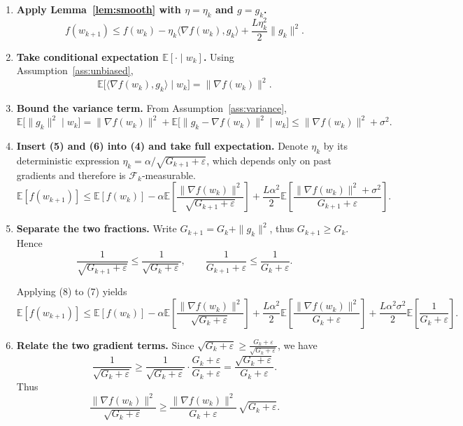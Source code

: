 \documentclass{article}
\newcommand{\E}{\mathbb{E}}
\begin{document}
\begin{enumerate}[label=[Step \arabic*],leftmargin=*]
\item \textbf{Apply Lemma~\ref{lem:smooth} with $\eta=\eta_k$ and $g=g_k$.}  
\[
f(w_{k+1})
\le f(w_k)-\eta_k\langle\nabla f(w_k),g_k\rangle
+\frac{L\eta_k^{2}}{2}\|g_k\|^{2}.
\tag{4}
\]

\item \textbf{Take conditional expectation $\E[\cdot\mid w_k]$.}  
Using Assumption~\ref{ass:unbiased},
\[
\E\bigl[\langle\nabla f(w_k),g_k\rangle\mid w_k\bigr]
= \|\nabla f(w_k)\|^{2}.
\tag{5}
\]

\item \textbf{Bound the variance term.}  
From Assumption~\ref{ass:variance},
\[
\E\bigl[\|g_k\|^{2}\mid w_k\bigr]
= \|\nabla f(w_k)\|^{2}+\E\bigl[\|g_k-\nabla f(w_k)\|^{2}\mid w_k\bigr]
\le \|\nabla f(w_k)\|^{2}+\sigma^{2}.
\tag{6}
\]

\item \textbf{Insert (5) and (6) into (4) and take full expectation.}  
Denote $\eta_k$ by its deterministic expression
$\eta_k=\alpha/\sqrt{G_{k+1}+\varepsilon}$, which depends only on past gradients and therefore is $\mathcal{F}_k$‑measurable.
\[
\E[f(w_{k+1})]
\le \E[f(w_k)]
-\alpha\E\!\left[\frac{\|\nabla f(w_k)\|^{2}}{\sqrt{G_{k+1}+\varepsilon}}\right]
+\frac{L\alpha^{2}}{2}\E\!\left[\frac{\|\nabla f(w_k)\|^{2}+\sigma^{2}}{G_{k+1}+\varepsilon}\right].
\tag{7}
\]

\item \textbf{Separate the two fractions.}  
Write $G_{k+1}=G_k+ \|g_k\|^{2}$, thus $G_{k+1}\ge G_k$. Hence
\[
\frac{1}{\sqrt{G_{k+1}+\varepsilon}}
\le \frac{1}{\sqrt{G_{k}+\varepsilon}},
\qquad
\frac{1}{G_{k+1}+\varepsilon}
\le \frac{1}{G_{k}+\varepsilon}.
\tag{8}
\]

Applying (8) to (7) yields
\[
\E[f(w_{k+1})]
\le \E[f(w_k)]
-\alpha\E\!\left[\frac{\|\nabla f(w_k)\|^{2}}{\sqrt{G_{k}+\varepsilon}}\right]
+\frac{L\alpha^{2}}{2}\E\!\left[\frac{\|\nabla f(w_k)\|^{2}}{G_{k}+\varepsilon}\right]
+\frac{L\alpha^{2}\sigma^{2}}{2}\E\!\left[\frac{1}{G_{k}+\varepsilon}\right].
\tag{9}
\]

\item \textbf{Relate the two gradient terms.}  
Since $\sqrt{G_{k}+\varepsilon}\ge \frac{G_{k}+\varepsilon}{\sqrt{G_{k}+\varepsilon}}$, we have
\[
\frac{1}{\sqrt{G_{k}+\varepsilon}}
\ge \frac{1}{\sqrt{G_{k}+\varepsilon}}\cdot\frac{G_{k}+\varepsilon}{G_{k}+\varepsilon}
= \frac{\sqrt{G_{k}+\varepsilon}}{G_{k}+\varepsilon}.
\tag{10}
\]
Thus
\[
\frac{\|\nabla f(w_k)\|^{2}}{\sqrt{G_{k}+\varepsilon}}
\ge \frac{\|\nabla f(w_k)\|^{2}}{G_{k}+\varepsilon}\,\sqrt{G_{k}+\varepsilon}.
\tag{11}
\]


\end{enumerate}
\end{document}
